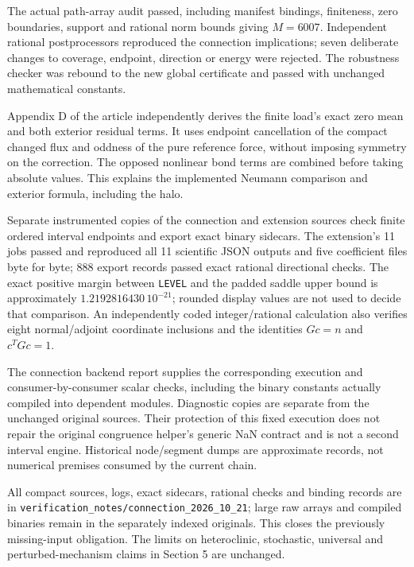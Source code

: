 \documentclass[10pt]{article}
\newcommand{\code}[1]{\nolinkurl{#1}}
\begin{document}
The actual path-array audit passed, including manifest bindings, finiteness,
zero boundaries, support and rational norm bounds giving $M=6007$.
Independent rational postprocessors reproduced the connection implications;
seven deliberate changes to coverage, endpoint, direction or energy were
rejected. The robustness checker was rebound to the new global certificate
and passed with unchanged mathematical constants.

Appendix D of the article independently derives the finite load's exact
zero mean and both exterior residual terms. It uses endpoint cancellation
of the compact changed flux and oddness of the pure reference force,
without imposing symmetry on the correction. The opposed nonlinear bond
terms are combined before taking absolute values. This explains the
implemented Neumann comparison and exterior formula, including the halo.

Separate instrumented copies of the connection and extension sources check
finite ordered interval endpoints and export exact binary sidecars.
The extension's 11 jobs passed and reproduced all 11 scientific JSON
outputs and five coefficient files byte for byte; 888 export records
passed exact rational directional checks. The exact positive margin
between \code{LEVEL} and the padded saddle upper bound is approximately
$1.2192816430\,10^{-21}$; rounded display values are not used to decide
that comparison. An independently coded integer/rational calculation
also verifies eight normal/adjoint coordinate inclusions and the identities
$Gc=n$ and $c^TGc=1$.

The connection backend report supplies the corresponding execution and
consumer-by-consumer scalar checks, including the binary constants actually
compiled into dependent modules. Diagnostic copies are separate from the
unchanged original sources. Their protection of this fixed execution does
not repair the original congruence helper's generic NaN contract and is
not a second interval engine. Historical node/segment dumps are approximate
records, not numerical premises consumed by the current chain.

All compact sources, logs, exact sidecars, rational checks and binding
records are in \code{verification_notes/connection_2026_10_21}; large raw
arrays and compiled binaries remain in the separately indexed originals.
This closes the previously missing-input obligation. The limits on
heteroclinic, stochastic, universal and perturbed-mechanism claims in
Section 5 are unchanged.
\end{document}
